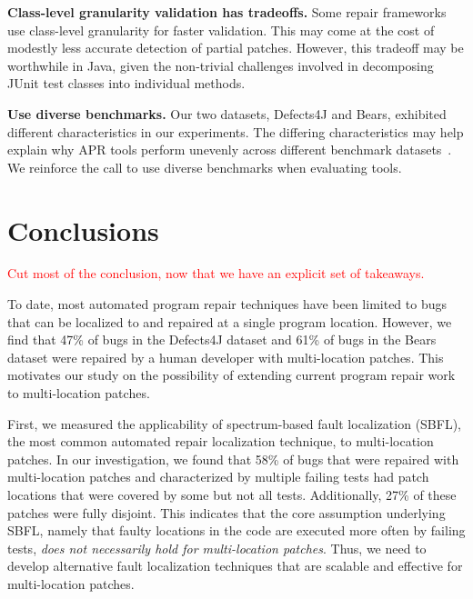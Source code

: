 \documentclass[sigconf, timestamp-false, anonymous=true]{acmart}
\newcommand\todo[1]{\textcolor{red}{#1}}
\begin{document}
\vspace{1ex}
\noindent\textbf{Class-level granularity validation has tradeoffs.} 
Some repair frameworks use class-level granularity for faster validation. 
This may come at the cost of modestly less accurate detection of partial patches.
However, this tradeoff may be worthwhile in Java, given the non-trivial challenges
involved in decomposing JUnit test classes into individual methods.

\vspace{1ex}
\noindent\textbf{Use diverse benchmarks.} Our two datasets, Defects4J and Bears, 
exhibited different characteristics in our experiments. The differing characteristics 
may help explain why APR tools perform unevenly across different 
benchmark datasets~\cite{durieux-repair-them-all}. We reinforce the 
call to use diverse benchmarks when evaluating tools.


\section{Conclusions}
\label{sec:conclusions}

\todo{Cut most of the conclusion, now that we have an explicit set of takeaways.}

To date, most automated program repair techniques have been limited to bugs that
can be localized to and repaired at a single program location. However, we find
that 47\% of bugs in the Defects4J dataset and 61\% of bugs in the Bears dataset
were repaired by a human developer with multi-location patches. This motivates
our study on the possibility of extending current program repair work to
multi-location patches.

First, we measured the applicability of spectrum-based fault localization
(SBFL), the most common automated repair localization technique, to  multi-location 
patches.  In our investigation, we found
that 58\% of bugs that were repaired with multi-location patches and
characterized by multiple failing tests had patch locations that were covered by
some but not all tests. Additionally, 27\% of these patches were fully
disjoint. This indicates that the core assumption underlying SBFL, namely that
faulty locations in the code are executed more often by failing tests,
\emph{does not necessarily hold for multi-location patches}. Thus, we need to
develop alternative fault localization techniques that are scalable and
effective for multi-location patches.
\end{document}
